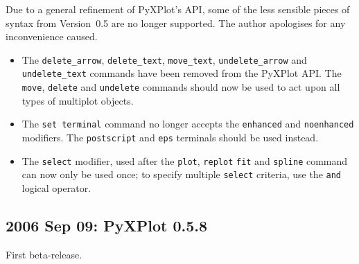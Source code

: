 \documentclass[a4paper,onecolumn,11pt]{book}
\begin{document}
Due to a general refinement of PyXPlot's API, some of the less sensible pieces
of syntax from Version~0.5 are no longer supported. The author apologises for
any inconvenience caused.

\begin{itemize}
\item The {\tt delete\_arrow}, {\tt delete\_text}, {\tt move\_text}, {\tt undelete\_arrow} and {\tt undelete\_text} commands have been removed from the PyXPlot API. The {\tt move}, {\tt delete} and {\tt undelete} commands should now be used to act upon all types of multiplot objects.
\item The {\tt set terminal} command no longer accepts the {\tt enhanced} and {\tt noenhanced} modifiers. The {\tt postscript} and {\tt eps} terminals should be used instead.
\item The {\tt select} modifier, used after the {\tt plot}, {\tt replot} {\tt fit} and {\tt spline} command can now only be used once; to specify multiple {\tt select} criteria, use the {\tt and} logical operator.
\end{itemize}

\subsection*{2006 Sep 09: PyXPlot 0.5.8}

First beta-release.

\printindex
\end{document}
